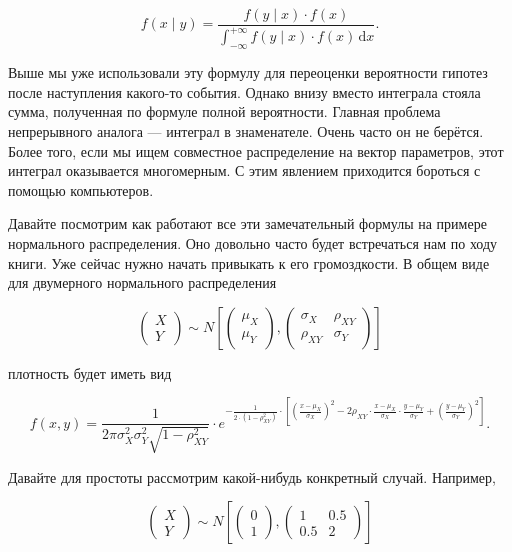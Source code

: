 \documentclass[12pt, a4paper, oneside]{extreport}
\newcommand{\dx}[1]{\,\mathrm{d}#1} %
\theoremstyle{plain}              %
\theoremstyle{definition}         %
\begin{document}
\[ f(x \mid y) = \frac{ f(y \mid x) \cdot f(x)}{\int_{-\infty}^{+\infty} f(y \mid x) \cdot f(x) \dx{x}}. \]

Выше мы уже использовали эту формулу для переоценки вероятности гипотез после наступления какого-то события. Однако внизу вместо интеграла стояла сумма, полученная по формуле полной вероятности.  Главная проблема непрерывного аналога --- интеграл в знаменателе. Очень часто он не берётся. Более того, если мы ищем совместное распределение на вектор параметров, этот интеграл оказывается многомерным. С этим явлением приходится бороться с помощью компьютеров.  

Давайте посмотрим как работают все эти замечательный формулы на примере нормального распределения. Оно довольно часто будет встречаться нам по ходу книги. Уже сейчас нужно начать привыкать к его громоздкости.  В общем виде для двумерного нормального распределения

\[ 
\begin{pmatrix}
X \\
Y
\end{pmatrix} \sim N \left[ 
\begin{pmatrix}
\mu_X \\
\mu_Y
\end{pmatrix} ,
\begin{pmatrix}
\sigma_X & \rho_{XY} \\
 \rho_{XY}  & \sigma_Y
\end{pmatrix} 
\right]
\]

плотность будет иметь вид

\[
f(x,y) = \frac{1}{2 \pi \sigma_X^2 \sigma_Y^2  \sqrt{1 - \rho_{XY}^2}} \cdot e^{-\frac{1}{2 \cdot (1 - \rho^2_{XY})} \cdot \left[ \left(  \frac{x - \mu_X}{\sigma_X}  \right)^2 - 2 \rho_{XY} \cdot \frac{x - \mu_X}{\sigma_X} \cdot \frac{y - \mu_Y}{\sigma_Y} + \left( \frac{y - \mu_Y}{\sigma_Y}    \right)^2   \right]}.
\]

Давайте для простоты рассмотрим какой-нибудь конкретный случай. Например, 

\[ 
\begin{pmatrix}
X \\
Y
\end{pmatrix} \sim N \left[
\begin{pmatrix}
0 \\
1
\end{pmatrix} ,
\begin{pmatrix}
1 & 0.5 \\
0.5  & 2
\end{pmatrix} 
\right]
\]
\end{document}
